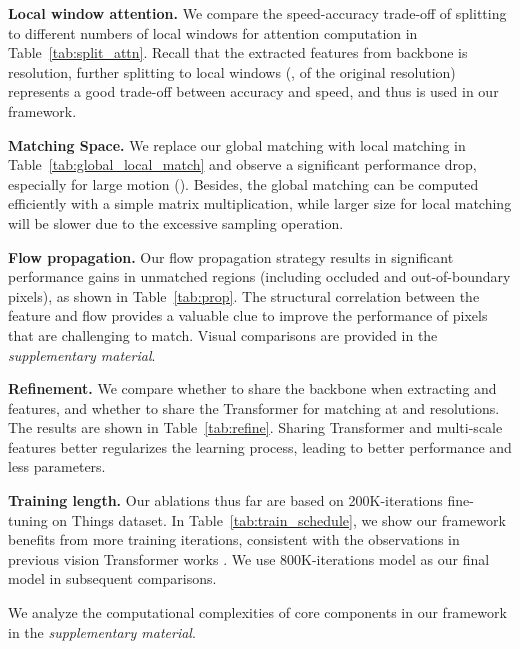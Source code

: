 \documentclass[10pt,twocolumn,letterpaper]{article}
\begin{document}
{\bf Local window attention.} We compare the speed-accuracy trade-off of splitting to different numbers of local windows for attention computation in Table~\ref{tab:split_attn}. Recall that the extracted features from backbone is  resolution, further splitting to  local windows (\ie,  of the original resolution) represents a good trade-off between accuracy and speed, and thus is used in our framework.

{\bf Matching Space.} We replace our global matching with local matching in Table~\ref{tab:global_local_match} and observe a significant performance drop, especially for large motion (). Besides, the global matching can be computed efficiently with a simple matrix multiplication, while larger size for local matching will be slower due to the excessive sampling operation.


{\bf Flow propagation.} Our flow propagation strategy results in significant performance gains in unmatched regions (including occluded and out-of-boundary pixels), as shown in Table~\ref{tab:prop}. The structural correlation between the feature and flow provides a valuable clue to improve the performance of pixels that are challenging to match. Visual comparisons are provided in the \emph{supplementary material}.


{\bf Refinement.} We compare whether to share the backbone when extracting  and  features, and whether to share the Transformer for matching at  and  resolutions. The results are shown in Table~\ref{tab:refine}. Sharing Transformer and multi-scale features better regularizes the learning process, leading to better performance and less parameters.


{\bf Training length.} Our ablations thus far are based on 200K-iterations fine-tuning on Things dataset. In Table~\ref{tab:train_schedule}, we show our framework benefits from more training iterations, consistent with the observations in previous vision Transformer works \cite{dosovitskiy2020image,liu2021Swin}. We use 800K-iterations model as our final model in subsequent comparisons.


We analyze the computational complexities of core components in our framework in the \emph{supplementary material}. 
\end{document}
